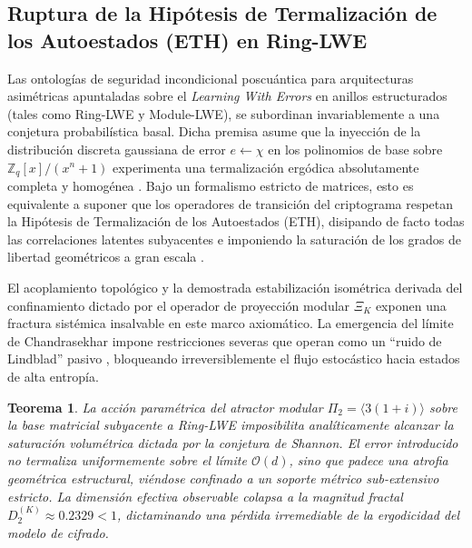 \documentclass{article}
\numberwithin{equation}{section}
\theoremstyle{plain}
\newtheorem{teorema}{Teorema}[section]
\theoremstyle{definition}
\begin{document}
\subsection{Ruptura de la Hipótesis de Termalización de los Autoestados (ETH) en Ring-LWE}

Las ontologías de seguridad incondicional poscuántica para arquitecturas asimétricas apuntaladas sobre el \textit{Learning With Errors} en anillos estructurados (tales como Ring-LWE y Module-LWE), se subordinan invariablemente a una conjetura probabilística basal. Dicha premisa asume que la inyección de la distribución discreta gaussiana de error $e \gets \chi$ en los polinomios de base sobre $\mathbb{Z}_q[x]/(x^n+1)$ experimenta una termalización ergódica absolutamente completa y homogénea \cite{Peikert2009, Regev2009}. Bajo un formalismo estricto de matrices, esto es equivalente a suponer que los operadores de transición del criptograma respetan la Hipótesis de Termalización de los Autoestados (ETH), disipando de facto todas las correlaciones latentes subyacentes e imponiendo la saturación de los grados de libertad geométricos a gran escala \cite{Pappalardi2023ETH}.

El acoplamiento topológico y la demostrada estabilización isométrica derivada del confinamiento dictado por el operador de proyección modular $\Xi_K$ exponen una fractura sistémica insalvable en este marco axiomático. La emergencia del límite de Chandrasekhar impone restricciones severas que operan como un ``ruido de Lindblad'' pasivo \cite{Khaymovich2021}, bloqueando irreversiblemente el flujo estocástico hacia estados de alta entropía.

\begin{teorema}
\label{teo:violacion_eth_lwe_uniqueqma}
La acción paramétrica del atractor modular $\Pi_2 = \langle 3(1+i) \rangle$ sobre la base matricial subyacente a Ring-LWE imposibilita analíticamente alcanzar la saturación volumétrica dictada por la conjetura de Shannon. El error introducido no termaliza uniformemente sobre el límite $\mathcal{O}(d)$, sino que padece una atrofia geométrica estructural, viéndose confinado a un soporte métrico sub-extensivo estricto. La dimensión efectiva observable colapsa a la magnitud fractal $D_2^{(K)} \approx 0.2329 < 1$, dictaminando una pérdida irremediable de la ergodicidad del modelo de cifrado.
\end{teorema}
\end{document}
